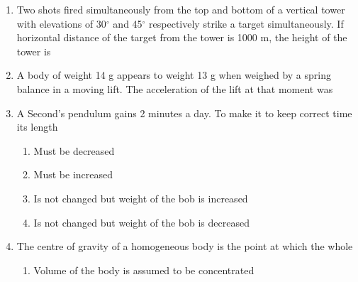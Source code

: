 \documentclass[11pt,a4paper]{article}
\begin{document}
\begin{enumerate}
{}
\\
\item{Two shots fired simultaneously from the top and bottom of a vertical tower with elevations of 30$^\circ$ and 45$^\circ$ respectively strike a target simultaneously. If horizontal distance of the target from the tower is 1000 m, the height of the tower is
}
\\
\item{A body of weight 14 g appears to weight 13 g when weighed by a spring balance in a moving lift. The acceleration of the lift at that moment was}
\\
\item{A Second's pendulum gains 2 minutes a day. To make it to keep correct time its length}
\begin{enumerate}[label=\Alph*.]
\item{Must be decreased}
\item{Must be increased}
\item{Is not changed but weight of the bob is increased}
\item{Is not changed but weight of the bob is decreased}
\end{enumerate}
\item{The centre of gravity of a homogeneous body is the point at which the whole}
\begin{enumerate}[label=\Alph*.]
\item{Volume of the body is assumed to be concentrated}

\end{enumerate}
\end{enumerate}
\end{document}
